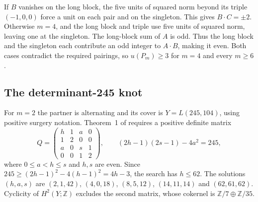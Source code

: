 If $B$ vanishes on the long block, the five units of squared norm beyond its triple $(-1,0,0)$ force a unit on each pair and on the singleton. This gives $B\cdot C=\pm2$. Otherwise $m=4$, and the long block and triple use five units of squared norm, leaving one at the singleton. The long-block sum of $A$ is odd. Thus the long block and the singleton each contribute an odd integer to $A\cdot B$, making it even. Both cases contradict the required pairings, so $u(P_m)\geq3$ for $m=4$ and every $m\geq6$.

\subsection{The determinant-245 knot}\label{sub:determinant245}
For $m=2$ the partner is alternating and its cover is $Y=L(245,104)$, using positive surgery notation. Theorem~1 of \cite{Owens} requires a positive definite matrix
\[
 Q=\begin{pmatrix}h&1&a&0\\1&2&0&0\\a&0&s&1\\0&0&1&2\end{pmatrix},\qquad
 (2h-1)(2s-1)-4a^2=245,
\]
where $0\leq a<h\leq s$ and $h,s$ are even. Since $245\geq(2h-1)^2-4(h-1)^2=4h-3$, the search has $h\leq62$. The solutions $(h,a,s)$ are $(2,1,42)$, $(4,0,18)$, $(8,5,12)$, $(14,11,14)$ and $(62,61,62)$. Cyclicity of $H^2(Y;\mathbb Z)$ excludes the second matrix, whose cokernel is $\mathbb Z/7\oplus\mathbb Z/35$.

